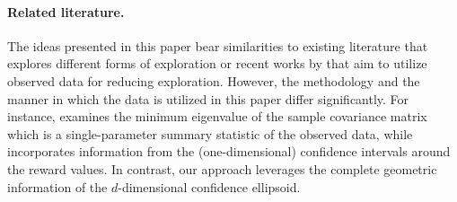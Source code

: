 \paragraph{Related literature.} The ideas presented in this paper bear similarities to existing literature that explores different forms of exploration \citep{russo2016information,kirschner2018heteroscedastic} or recent works by \citep{bastani2021mostly,pacchiano2020regret,hamidi2020general} that aim to utilize observed data for reducing exploration. However, the methodology and the manner in which the data is utilized in this paper differ significantly. For instance, \cite{bastani2021mostly} examines the minimum eigenvalue of the sample covariance matrix which is a single-parameter summary statistic of the observed data, while 
 \cite{hamidi2020general} incorporates information from the (one-dimensional) confidence intervals around the reward values. In contrast, our approach leverages the complete geometric information of the $d$-dimensional confidence ellipsoid.


  
  

